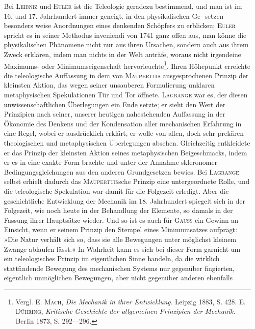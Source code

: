 Bei \textsc{Leibniz} und \textsc{Euler} ist die Teleologie geradezu bestimmend, und man
ist im 16. und 17. Jahrhundert immer geneigt, in den physikalischen Ge\nobreakdash-
\clearpage{}
\noindent setzen besonders weise Anordnungen eines denkenden Schöpfers zu erblicken;
\textsc{Euler} spricht es in seiner Methodus inveniendi von 1741 ganz offen aus, man
könne die physikalischen Phänomene nicht nur aus ihren Ursachen, sondern
auch aus ihrem Zweck erklären, indem man nichts in der Welt anträfe, woraus
nicht irgendeine Maximums- oder Minimumseigenschaft hervorleuchte\footnote{Vergl. E. \textsc{Mach}, \textit{Die Mechanik in ihrer Entwicklung.} Leipzig 1883, S. 428. E. \textsc{Dühring},
\textit{Kritische Geschichte der allgemeinen Prinzipien der Mechanik.} Berlin 1873, S. 292—296.}.
Ihren Höhepunkt erreichte die teleologische Auffassung in dem von \textsc{Maupertuis}
ausgesprochenen Prinzip der kleinsten Aktion, das wegen seiner unsauberen Formulierung
unklaren metaphysischen Spekulationen Tür und Tor öffnete. \textsc{Lagrange}
war es, der diesen unwissenschaftlichen Überlegungen ein Ende setzte; er sieht
den Wert der Prinzipien nach seiner, unserer heutigen nahestehenden Auffassung
in der Ökonomie des Denkens und der Kondensation aller mechanischen Erfahrung
in eine Regel, wobei er ausdrücklich erklärt, er wolle von allen, doch sehr prekären
theologischen und metaphysischen Überlegungen absehen. Gleichzeitig entkleidete
er das Prinzip der kleinsten Aktion seines metaphysischen Beigeschmacks,
indem er es in eine exakte Form brachte und unter der Annahme skleronomer
Bedingungsgleichungen aus den anderen Grundgesetzen bewies. Bei \textsc{Lagrange}
selbst erhielt dadurch das \textsc{Maupertuis}sche Prinzip eine untergeordnete Rolle, und
die teleologische Spekulation war damit für die Folgezeit erledigt. Aber die
geschichtliche Entwicklung der Mechanik im 18. Jahrhundert spiegelt sich in
der Folgezeit, wie noch heute in der Behandlung der Elemente, so damals in der
Fassung ihrer Hauptsätze wieder. Und so ist es auch für \textsc{Gauss} ein Gewinn an
Einsicht, wenn er seinem Prinzip den Stempel eines Minimumsatzes aufprägt:
»Die Natur verhält sich so, dass sie alle Bewegungen unter möglichst kleinem
Zwange ablaufen lässt.« In Wahrheit kann es sich bei dieser Form garnicht
um ein teleologisches Prinzip im eigentlichen Sinne handeln, da die wirklich
stattfindende Bewegung des mechanischen Systems nur gegenüber fingierten,
eigentlich unmöglichen Bewegungen, aber nicht gegenüber anderen ebenfalls
